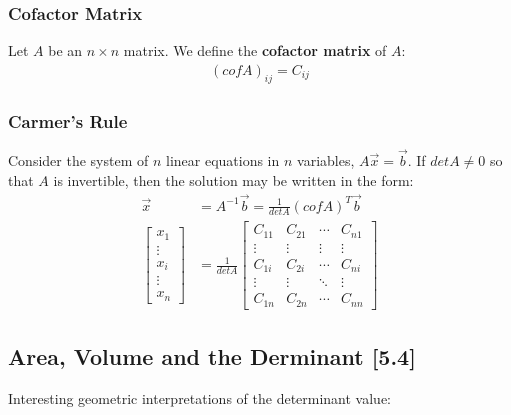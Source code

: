 \documentclass[a4paper,9pt]{extarticle}
\begin{document}
\begin{multicols*}{2}

\subsubsection{Cofactor Matrix}
Let $A$ be an $n \times n$ matrix. We define the \textbf{cofactor matrix} of $A$:
\begin{equation} \label{5.3-1}
    \begin{split}
        (cof A)_{ij} = C_{ij}
    \end{split}
\end{equation}


\subsubsection{Carmer's Rule}
Consider the system of $n$ linear equations in $n$ variables, $A \vec{x} = \vec{b}$. If $det A \neq 0$ so that $A$ is invertible, then the solution may be written in the form:
\begin{equation} \label{5.3-2}
    \begin{split}
        \vec{x} & = A^{-1} \vec{b} = \frac{1}{det A} (cof A)^T \vec{b} \\
        \begin{bmatrix}x_1 \\ \vdots \\ x_i \\ \vdots \\ x_n \end{bmatrix} & = \frac{1}{det A} \begin{bmatrix}C_{11} & C_{21} & \cdots & C_{n1} \\ \vdots & \vdots & \vdots & \vdots \\ C_{1i} & C_{2i} & \cdots & C_{ni} \\ \vdots & \vdots & \ddots & \vdots \\ C_{1n} & C_{2n} & \cdots  &C_{nn} \end{bmatrix}
    \end{split}
\end{equation}


\subsection{Area, Volume and the Derminant [5.4]}
Interesting geometric interpretations of the determinant value:


\end{multicols*}
\end{document}
